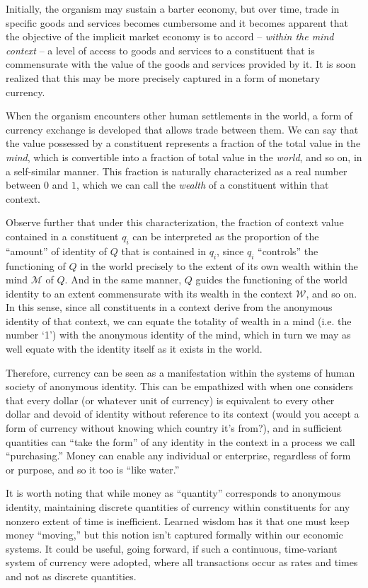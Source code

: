 \documentclass[pra,twocolumn,groupedaddress,10pt]{revtex4}
\theoremstyle{definition}
\begin{document}
Initially, the organism may sustain a barter economy, but over time, trade in specific goods and services becomes cumbersome and it becomes apparent that the objective of the implicit market economy is to accord -- \textit{within the mind context} -- a level of access to goods and services to a constituent that is commensurate with the value of the goods and services provided by it. It is soon realized that this may be more precisely captured in a form of monetary currency.

When the organism encounters other human settlements in the world, a form of currency exchange is developed that allows trade between them. We can say that the value possessed by a constituent represents a fraction of the total value in the \textit{mind}, which is convertible into a fraction of total value in the \textit{world}, and so on, in a self-similar manner. This fraction is naturally characterized as a real number between $0$ and $1$, which we can call the \textit{wealth} of a constituent within that context.

Observe further that under this characterization, the fraction of context value contained in a constituent $q_i$ can be interpreted as the proportion of the ``amount'' of identity of $Q$ that is contained in $q_{i}$, since $q_{i}$ ``controls'' the functioning of $Q$ in the world precisely to the extent of its own wealth within the mind $\mathcal{M}$ of $Q$. And in the same manner, $Q$ guides the functioning of the world identity to an extent commensurate with its wealth in the context $\mathcal{W}$, and so on. In this sense, since all constituents in a context derive from the anonymous identity of that context, we can equate the totality of wealth in a mind (i.e. the number `1') with the anonymous identity of the mind, which in turn we may as well equate with the identity itself as it exists in the world.

Therefore, currency can be seen as a manifestation within the systems of human society of anonymous identity. This can be empathized with when one considers that every dollar (or whatever unit of currency) is equivalent to every other dollar and devoid of identity without reference to its context (would you accept a form of currency without knowing which country it's from?), and in sufficient quantities can ``take the form'' of any identity in the context in a process we call ``purchasing.'' Money can enable any individual or enterprise, regardless of form or purpose, and so it too is ``like water.''

It is worth noting that while money as ``quantity'' corresponds to anonymous identity, maintaining discrete quantities of currency within constituents for any nonzero extent of time is inefficient. Learned wisdom has it that one must keep money ``moving,'' but this notion isn't captured formally within our economic systems. It could be useful, going forward, if such a continuous, time-variant system of currency were adopted, where all transactions occur as rates and times and not as discrete quantities.
\end{document}
